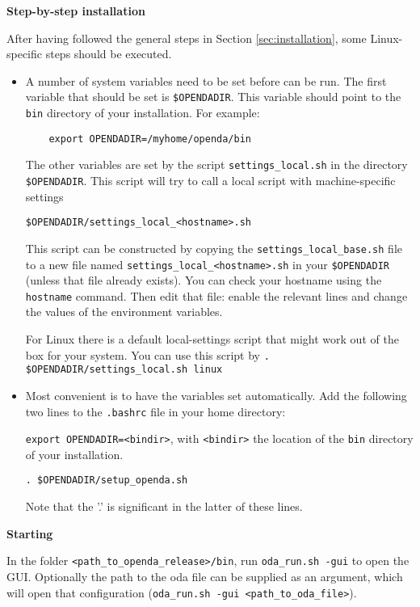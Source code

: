 \textbf{Step-by-step installation}

After having followed the general steps in Section \ref{sec:installation}, some Linux-specific steps should be executed.
\begin{itemize}
\item
A number of system variables need to be set before \oda can be run. The first variable that should be set is 
\verb|$OPENDADIR|. This variable should point to the \verb|bin| directory of your \oda installation. For example:
\begin{verbatim}
    export OPENDADIR=/myhome/openda/bin
\end{verbatim}
		
The other variables are set by the script \verb|settings_local.sh| in the directory \verb|$OPENDADIR|. This script will try to call a local script with machine-specific settings 
\begin{verbatim}
$OPENDADIR/settings_local_<hostname>.sh
\end{verbatim}
This script can be constructed by copying the \verb|settings_local_base.sh| file to a new file named \verb|settings_local_<hostname>.sh| in your \verb|$OPENDADIR| (unless that file already exists). You can check your hostname using the \verb|hostname| command. Then edit that file: enable the relevant lines and change the values of the environment variables.

For Linux there is a default local-settings script that might work out of the box for your system. You can use this script by
\verb|. $OPENDADIR/settings_local.sh linux|
\item
Most convenient is to have the variables set automatically. Add the following two lines to the \verb|.bashrc| file in your home directory:

\verb|export OPENDADIR=<bindir>|, with \verb|<bindir>| the location of the \verb|bin| directory of your \oda installation.

\verb|. $OPENDADIR/setup_openda.sh|

Note that the '.' is significant in the latter of these lines.
\end{itemize}


\textbf{Starting \oda}

In the folder \verb|<path_to_openda_release>/bin|, run \verb|oda_run.sh -gui| to open the \oda GUI. Optionally the path to the oda file can be supplied as an argument, which will open that \oda configuration (\verb|oda_run.sh -gui <path_to_oda_file>|).

